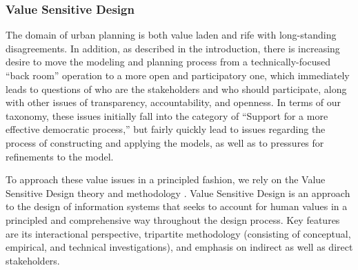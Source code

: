 \subsubsection{Value Sensitive Design}
\label{sec:vsd}

The domain of urban planning is both value laden and rife with
long-standing disagreements.  In addition, as described in the
introduction, there is increasing desire to move the modeling and planning
process from a technically-focused ``back room'' operation to a more open
and participatory one, which immediately leads to questions of who are the
stakeholders and who should participate, along with other issues of
transparency, accountability, and openness.  In terms of our taxonomy,
these issues initially fall into the category of ``Support for a more
effective democratic process,'' but fairly quickly lead to issues regarding
the process of constructing and applying the models, as well as to
pressures for refinements to the model.

To approach these value issues in a principled fashion, we rely on the
Value Sensitive Design theory and methodology \cite{friedman-amis-2006}.
Value Sensitive Design is an approach to the design of information systems
that seeks to account for human values in a principled and comprehensive
way throughout the design process.  Key features are its interactional
perspective, tripartite methodology (consisting of conceptual, empirical,
and technical investigations), and emphasis on indirect as well as direct
stakeholders.


